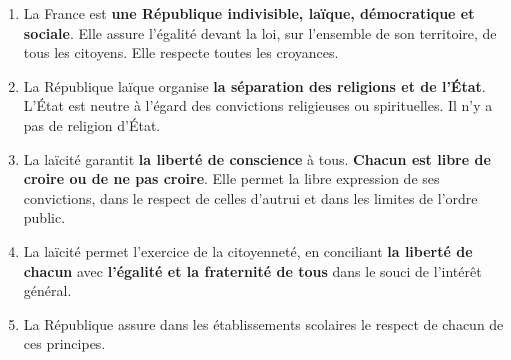 \begin{enumerate}
\item La France est \textbf{une République indivisible, laïque, démocratique et sociale}. Elle assure l'égalité devant la loi, sur l'ensemble de son territoire, de tous les citoyens. Elle respecte toutes les croyances.
\item La République laïque organise \textbf{la séparation des religions et de l'État}. L'État est neutre à l'égard des convictions religieuses ou spirituelles. Il n'y a pas de religion d'État.
\item La laïcité garantit \textbf{la liberté de conscience} à tous. \textbf{Chacun est libre de croire ou de ne pas croire}. Elle permet la libre expression de ses convictions, dans le respect de celles d'autrui et dans les limites de l'ordre public.
\item La laïcité permet l'exercice de la citoyenneté, en conciliant \textbf{la liberté de chacun} avec \textbf{l'égalité et la fraternité de tous} dans le souci de l'intérêt général.
\item La République assure dans les établissements scolaires le respect de chacun de ces principes.

\end{enumerate}
